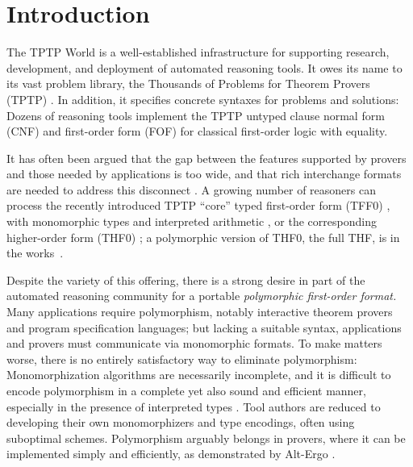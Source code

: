 \section{Introduction}
\label{sec_intro}

The TPTP World \cite{sutcliffe-2010-world} is a well-established infrastructure
for supporting research, development, and deployment of automated reasoning
tools. It owes its name to its vast problem library, the Thousands of Problems for Theorem
Provers (TPTP) \cite{sutcliffe-2009-lib}. In addition, it specifies concrete
syntaxes for problems and solutions:
Dozens of reasoning tools implement the TPTP untyped clause normal form
(CNF) and first-order form (FOF) for classical
first-order logic with equality.

It has often been argued that the gap between the features supported by provers
and those needed by applications is too wide, and that rich interchange formats
are needed to address this disconnect \cite{voronkov-2003,kuncak-2011}.
A growing number of reasoners can process the
recently introduced TPTP ``core'' typed first-order form (TFF0) \cite{sutcliffe-et-al-2012-tff0},
with monomorphic types and interpreted arithmetic \cite{SPASS-T,vampire-arith},
or the corresponding higher-order form (THF0) \cite{benzmueller-et-al-2008-thf0};
a polymorphic version of THF0, the full THF, is in the works~\cite{sutcliffe-benzmueller-2010}.

Despite the variety of this offering, there is a strong desire in part of the automated
reasoning community for a portable \emph{polymorphic first-order format.} Many applications
require polymorphism, notably interactive theorem provers and program
specification languages; but lacking a suitable syntax, applications
and provers must communicate via monomorphic formats. To make matters worse, there is no entirely
satisfactory way to eliminate polymorphism: Monomorphization algorithms are %
necessarily incomplete,
and it is difficult to encode polymorphism in a complete yet
also sound and efficient manner,
especially in the presence of interpreted types
\cite{blanchette-et-al-2013-types,bobot-paskevich-2011,leino-ruemmer-2010}. Tool authors
are reduced to developing their own monomorphizers and type encodings, often
using suboptimal schemes. Polymorphism arguably belongs in
provers, where it can be implemented simply and efficiently, as demonstrated by
Alt-Ergo \cite{bobot-et-al-2008}.

\pagebreak


